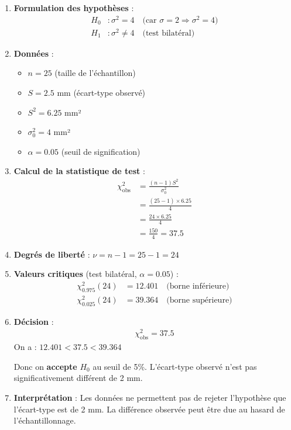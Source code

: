 \documentclass[11pt,a4paper]{article}
\newcommand{\chideux}{\chi^2}
\begin{document}
\begin{enumerate}
    \item \textbf{Formulation des hypothèses} :
    \begin{align*}
    H_0 &: \sigma^2 = 4 \quad \text{(car } \sigma = 2 \Rightarrow \sigma^2 = 4\text{)} \\
    H_1 &: \sigma^2 \neq 4 \quad \text{(test bilatéral)}
    \end{align*}
    
    \item \textbf{Données} :
    \begin{itemize}
        \item $n = 25$ (taille de l'échantillon)
        \item $S = 2.5$ mm (écart-type observé)
        \item $S^2 = 6.25$ mm²
        \item $\sigma_0^2 = 4$ mm²
        \item $\alpha = 0.05$ (seuil de signification)
    \end{itemize}
    
    \item \textbf{Calcul de la statistique de test} :
    \begin{align*}
    \chideux_{\text{obs}} &= \frac{(n-1)S^2}{\sigma_0^2} \\
    &= \frac{(25-1) \times 6.25}{4} \\
    &= \frac{24 \times 6.25}{4} \\
    &= \frac{150}{4} = 37.5
    \end{align*}
    
    \item \textbf{Degrés de liberté} : $\nu = n - 1 = 25 - 1 = 24$
    
    \item \textbf{Valeurs critiques} (test bilatéral, $\alpha = 0.05$) :
    \begin{align*}
    \chideux_{0.975}(24) &= 12.401 \quad \text{(borne inférieure)} \\
    \chideux_{0.025}(24) &= 39.364 \quad \text{(borne supérieure)}
    \end{align*}
    
    \item \textbf{Décision} :
    \begin{align*}
    \chideux_{\text{obs}} = 37.5
    \end{align*}
    On a : $12.401 < 37.5 < 39.364$
    
    Donc on \textbf{accepte} $H_0$ au seuil de 5\%. L'écart-type observé n'est pas significativement différent de 2 mm.
    
    \item \textbf{Interprétation} : Les données ne permettent pas de rejeter l'hypothèse que l'écart-type est de 2 mm. La différence observée peut être due au hasard de l'échantillonnage.
\end{enumerate}
\end{document}
